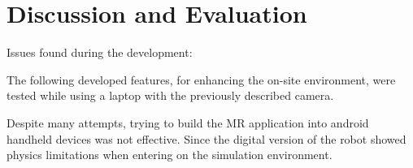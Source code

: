 \chapter{Discussion and Evaluation}

Issues found during the development:

The following developed features, for enhancing the on-site environment, were tested while using a laptop with the previously described camera.

    Despite many attempts, trying to build the \ac{MR} application into android handheld devices was not effective.
    Since the digital version of the robot showed physics limitations when entering on the simulation environment.

